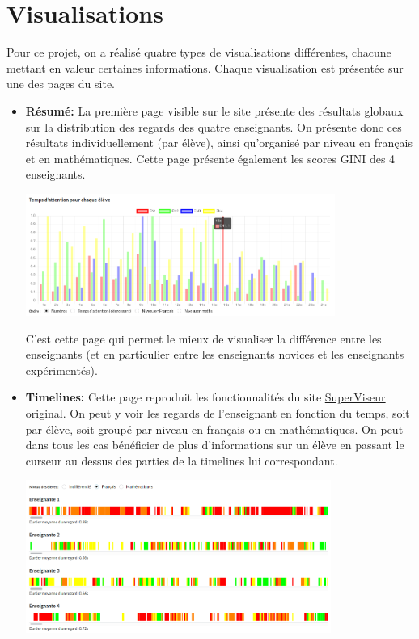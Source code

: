 \documentclass{article}
\begin{document}
\section{Visualisations}
Pour ce projet, on a réalisé quatre types de visualisations différentes, chacune mettant en valeur certaines informations. Chaque visualisation est présentée sur une des pages du site.
\begin{itemize}
    \item \textbf{Résumé:} La première page visible sur le site présente des résultats globaux sur la distribution des regards des quatre enseignants. On présente donc ces résultats individuellement (par élève), ainsi qu'organisé par niveau en français et en mathématiques. Cette page présente également les scores GINI des 4 enseignants. 
        \begin{center}
            \includegraphics[height=4cm]{resume.png}
        \end{center}
        C'est cette page qui permet le mieux de visualiser la différence entre les enseignants (et en particulier entre les enseignants novices et les enseignants expérimentés).\\
    \item \textbf{Timelines:} Cette page reproduit les fonctionnalités du site \href{http://superviseur.lip6.fr/}{SuperViseur} original. On peut y voir les regards de l'enseignant en fonction du temps, soit par élève, soit groupé par niveau en français ou en mathématiques. On peut dans tous les cas bénéficier de plus d'informations sur un élève en passant le curseur au dessus des parties de la timelines lui correspondant. 
        \begin{center}
            \includegraphics[height=5cm]{timelines.png}

\end{center}
\end{itemize}
\end{document}
